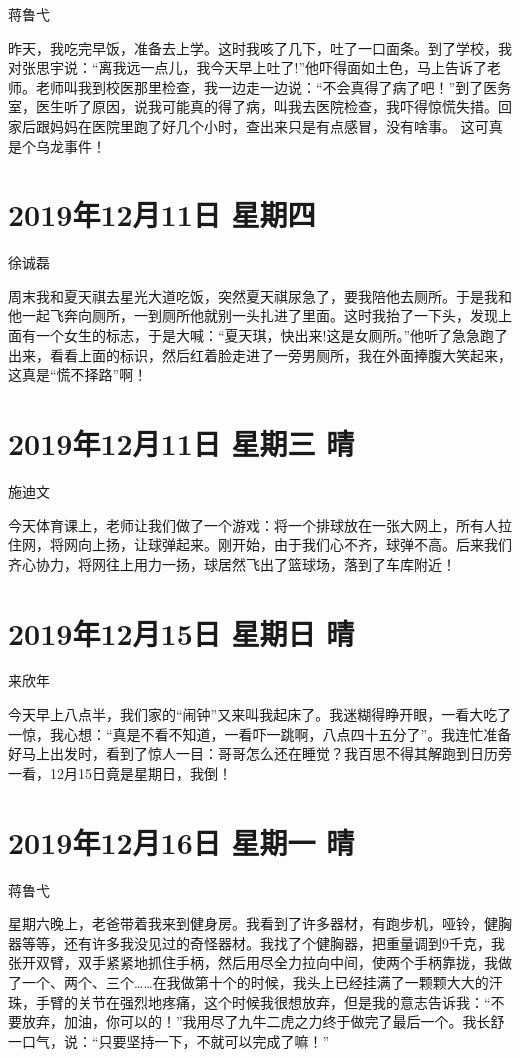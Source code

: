 蒋鲁弋

昨天，我吃完早饭，准备去上学。这时我咳了几下，吐了一口面条。到了学校，我对张思宇说：``离我远一点儿，我今天早上吐了!''他吓得面如土色，马上告诉了老师。老师叫我到校医那里检查，我一边走一边说：``不会真得了病了吧！''到了医务室，医生听了原因，说我可能真的得了病，叫我去医院检查，我吓得惊慌失措。回家后跟妈妈在医院里跑了好几个小时，查出来只是有点感冒，没有啥事。
这可真是个乌龙事件！

\section{2019年12月11日 星期四}

徐诚磊

周末我和夏天祺去星光大道吃饭，突然夏天祺尿急了，要我陪他去厕所。于是我和他一起飞奔向厕所，一到厕所他就别一头扎进了里面。这时我抬了一下头，发现上面有一个女生的标志，于是大喊：``夏天琪，快出来!这是女厕所。''他听了急急跑了出来，看看上面的标识，然后红着脸走进了一旁男厕所，我在外面捧腹大笑起来，这真是``慌不择路''啊！

\section{2019年12月11日 星期三 晴}

施迪文

今天体育课上，老师让我们做了一个游戏：将一个排球放在一张大网上，所有人拉住网，将网向上扬，让球弹起来。刚开始，由于我们心不齐，球弹不高。后来我们齐心协力，将网往上用力一扬，球居然飞出了篮球场，落到了车库附近！

\section{2019年12月15日 星期日 晴}

来欣年

今天早上八点半，我们家的``闹钟''又来叫我起床了。我迷糊得睁开眼，一看大吃了一惊，我心想：``真是不看不知道，一看吓一跳啊，八点四十五分了''。我连忙准备好马上出发时，看到了惊人一目：哥哥怎么还在睡觉？我百思不得其解跑到日历旁一看，12月15日竟是星期日，我倒！

\section{2019年12月16日 星期一 晴}

蒋鲁弋

星期六晚上，老爸带着我来到健身房。我看到了许多器材，有跑步机，哑铃，健胸器等等，还有许多我没见过的奇怪器材。我找了个健胸器，把重量调到9千克，我张开双臂，双手紧紧地抓住手柄，然后用尽全力拉向中间，使两个手柄靠拢，我做了一个、两个、三个\ldots\ldots 在我做第十个的时候，我头上已经挂满了一颗颗大大的汗珠，手臂的关节在强烈地疼痛，这个时候我很想放弃，但是我的意志告诉我：``不要放弃，加油，你可以的！''我用尽了九牛二虎之力终于做完了最后一个。我长舒一口气，说：``只要坚持一下，不就可以完成了嘛！''

